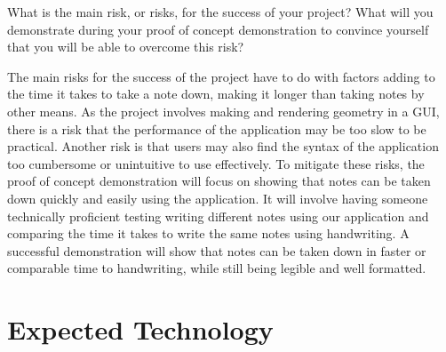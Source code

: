 \documentclass{article}
\begin{document}
What is the main risk, or risks, for the success of your project?  What will you
demonstrate during your proof of concept demonstration to convince yourself that
you will be able to overcome this risk?

The main risks for the success of the project have to do with factors adding 
to the time it takes to take a note down, making it longer than
taking notes by other means. As the project involves making and rendering 
geometry in a GUI, there is a risk that the performance of the 
application may be too slow to be practical. Another risk is that users may 
also find the syntax of the application too cumbersome or 
unintuitive to use effectively. To mitigate these risks, the proof of concept 
demonstration will focus on showing that notes can be taken 
down quickly and easily using the application. It will involve having someone
 technically proficient testing writing different notes using our 
application and comparing the time it takes to write the same notes using 
handwriting. A successful demonstration will show that notes can be 
taken down in faster or comparable time to handwriting, while still being 
legible and well formatted.

\section{Expected Technology}



\end{document}
